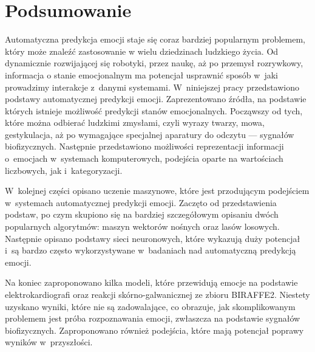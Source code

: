 \chapter*{Podsumowanie}\label{ch:podsumowanie}

Automatyczna predykcja emocji staje się coraz bardziej popularnym problemem, który może znaleźć zastosowanie w wielu dziedzinach ludzkiego życia.
Od dynamicznie rozwijającej się robotyki, przez naukę, aż po przemysł rozrywkowy, informacja o stanie emocjonalnym ma potencjał usprawnić sposób w~jaki prowadzimy interakcje z~danymi systemami.
W~niniejszej pracy przedstawiono podstawy automatycznej predykcji emocji.
Zaprezentowano źródła, na podstawie których istnieje możliwość predykcji stanów emocjonalnych.
Począwszy od tych, które można odbierać ludzkimi zmysłami, czyli wyrazy twarzy, mowa, gestykulacja, aż po wymagające specjalnej aparatury do odczytu — sygnałów biofizycznych.
Następnie przedstawiono możliwości reprezentacji informacji o~emocjach w~systemach komputerowych, podejścia oparte na wartościach liczbowych, jak i~kategoryzacji.

W~kolejnej części opisano uczenie maszynowe, które jest przodującym podejściem w~systemach automatycznej predykcji emocji.
Zaczęto od przedstawienia podstaw, po czym skupiono się na bardziej szczegółowym opisaniu dwóch popularnych algorytmów: maszyn wektorów nośnych oraz lasów losowych.
Następnie opisano podstawy sieci neuronowych, które wykazują duży potencjał i~są bardzo często wykorzystywane w~badaniach nad automatyczną predykcją emocji.

Na koniec zaproponowano kilka modeli, które przewidują emocje na podstawie elektrokardiografi oraz reakcji skórno-galwanicznej ze zbioru BIRAFFE2.
Niestety uzyskano wyniki, które nie są zadowalające, co obrazuje, jak skomplikowanym problemem jest próba rozpoznawania emocji, zwłaszcza na podstawie sygnałów biofizycznych.
Zaproponowano również podejścia, które mają potencjał poprawy wyników w~przyszłości.
